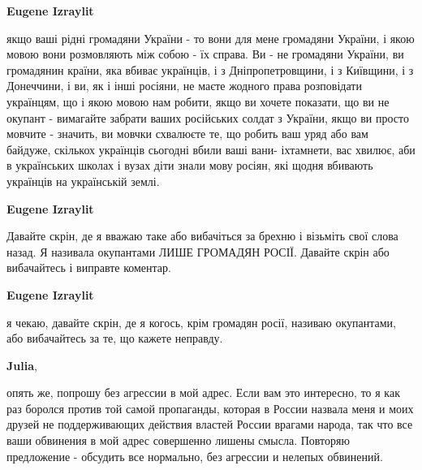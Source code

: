 \begin{itemize}
\begin{itemize}
\textbf{Eugene Izraylit} 

якщо ваші рідні громадяни України - то вони для мене громадяни України, і якою
мовою вони розмовляють між собою - їх справа. Ви - не громадяни України, ви
громадянин країни, яка вбиває українців, і з Дніпропетровщини, і з Київщини, і
з Донеччини, і ви, як і інші росіяни, не маєте жодного права розповідати
українцям, що і якою мовою нам робити, якщо ви хочете показати, що ви не
окупант - вимагайте забрати ваших російських солдат з України, якщо ви просто
мовчите - значить, ви мовчки схвалюєте те, що робить ваш уряд або вам байдуже,
скількох українців сьогодні вбили ваші вани- іхтамнети, вас хвилює, аби в
українських школах і вузах діти знали мову росіян, які щодня вбивають українців
на українській землі.

 
\textbf{Eugene Izraylit} 

Давайте скрін, де я вважаю таке або вибачіться за брехню і візьміть свої слова
назад. Я називала окупантами ЛИШЕ ГРОМАДЯН РОСІЇ. Давайте скрін або вибачайтесь
і виправте коментар.


 
\textbf{Eugene Izraylit} 

я чекаю, давайте скрін, де я когось, крім громадян росії, називаю окупантами,
або вибачайтесь за те, що кажете неправду.

 
\textbf{Julia}, 

опять же, попрошу без агрессии в мой адрес. Если вам это интересно, то я как
раз боролся против той самой пропаганды, которая в России назвала меня и моих
друзей не поддерживающих действия властей России врагами народа, так что все
ваши обвинения в мой адрес совершенно лишены смысла. Повторяю предложение -
обсудить все нормально, без агрессии и нелепых обвинений.



\end{itemize}
\end{itemize}
